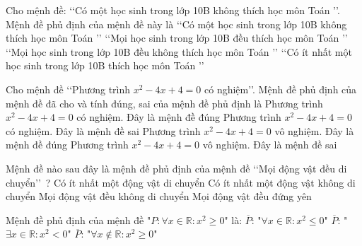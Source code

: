 \begin{ex}%
	Cho mệnh đề: \lq\lq  Có một học sinh trong lớp 10B không thích học môn Toán \rq\rq. Mệnh đề phủ định của mệnh đề này là
	\choice 
		{\lq\lq  Có một học sinh trong lớp 10B không thích học môn Toán \rq\rq}
		 {\True \lq\lq Mọi học sinh trong lớp 10B đều thích học môn Toán \rq\rq}
		{\lq\lq Mọi học sinh  trong lớp 10B đều không thích học môn Toán \rq\rq}
		{\lq\lq Có ít nhất một học sinh trong lớp 10B thích  học môn Toán \rq\rq}
\end{ex}

\begin{ex}%
	Cho mệnh đề \lq\lq Phương trình $x^2-4x+4=0$ có nghiệm\rq\rq. Mệnh đề  phủ định của mệnh đề đã cho và tính đúng, sai của mệnh đề phủ định là
	\choice 
		 {Phương trình $x^2-4x+4=0$ có nghiệm. Đây là mệnh đề đúng}
		{Phương  trình $x^2-4x+4=0$ có nghiệm. Đây là mệnh đề sai}
		{Phương  trình $x^2-4x+4=0$ vô nghiệm. Đây là mệnh đề đúng}
		{\True Phương trình $x^2-4x+4=0$ vô nghiệm. Đây là mệnh đề sai} 
\end{ex}

\begin{ex}%
	Mệnh đề nào sau  đây là mệnh đề phủ định của mệnh đề \lq\lq Mọi động vật đều di chuyển\rq\rq\ ?
	 \choice
		{Có ít nhất một  động vật di chuyển}
		{\True  Có ít nhất một động vật không di chuyển}
		 {Mọi động vật đều không di chuyển}
		{Mọi  động vật đều đứng yên}
\end{ex}

\begin{ex}%
	Mệnh đề  phủ định của mệnh đề "$P: \forall x\in\mathbb{R}: x^2\geq 0$" là:
		{$\overline{P}$:  "$\forall x\in\mathbb{R}: x^2\leq 0$"}
		{\True $\overline{P}$:  "$\exists x\in\mathbb{R}: x^2<0$"}
		{$\overline{P}$: "$\forall x\notin\mathbb{R}: x^2\geq  0$"}
\end{ex}

